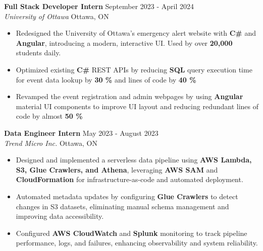 \documentclass[a4paper]{article}
\begin{document}

\textbf{Full Stack Developer Intern } \hfill September 2023 - April 2024\\
\textit{University of Ottawa} \hfill Ottawa, ON\\
\vspace{-2mm}
\begin{itemize} \itemsep -2pt
    \item Redesigned the University of Ottawa's emergency alert website with \textbf{C\#} and \textbf{Angular}, introducing a modern, interactive UI. Used by over \textbf{20,000} students daily.
     \item Optimized existing \textbf{C\#} REST APIs by reducing \textbf{SQL} query execution time for event data lookup by \textbf{30 \%} and lines of code by \textbf{40 \%}
    \item Revamped the event registration and admin webpages by using \textbf{Angular} material UI components to improve UI layout and reducing redundant lines of code by almost \textbf{50 \%}
\end{itemize}


\textbf{Data Engineer Intern} \hfill May 2023 - August 2023\\
\textit{Trend Micro Inc.} \hfill Ottawa, ON\\
\vspace{-2mm}
\begin{itemize} \itemsep -2pt

\item Designed and implemented a serverless data pipeline using \textbf{AWS Lambda, S3, Glue Crawlers, and Athena}, leveraging \textbf{AWS SAM} and \textbf{CloudFormation} for infrastructure-as-code and automated deployment.

\item Automated metadata updates by configuring \textbf{Glue Crawlers} to detect changes in S3 datasets, eliminating manual schema management and improving data accessibility.

\item Configured \textbf{AWS CloudWatch} and \textbf{Splunk} monitoring to track pipeline performance, logs, and failures, enhancing observability and system reliability.


\end{itemize}
\end{document}
